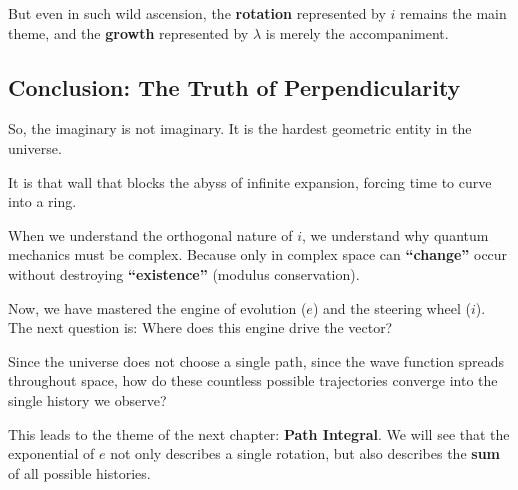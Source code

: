 But even in such wild ascension, the \textbf{rotation} represented by $i$ remains the main theme, and the \textbf{growth} represented by $\lambda$ is merely the accompaniment.

\subsection{Conclusion: The Truth of Perpendicularity}

So, the imaginary is not imaginary. It is the hardest geometric entity in the universe.

It is that wall that blocks the abyss of infinite expansion, forcing time to curve into a ring.

When we understand the orthogonal nature of $i$, we understand why quantum mechanics must be complex. Because only in complex space can \textbf{``change''} occur without destroying \textbf{``existence''} (modulus conservation).

Now, we have mastered the engine of evolution ($e$) and the steering wheel ($i$). The next question is: Where does this engine drive the vector?

Since the universe does not choose a single path, since the wave function spreads throughout space, how do these countless possible trajectories converge into the single history we observe?

This leads to the theme of the next chapter: \textbf{Path Integral}. We will see that the exponential of $e$ not only describes a single rotation, but also describes the \textbf{sum} of all possible histories.

